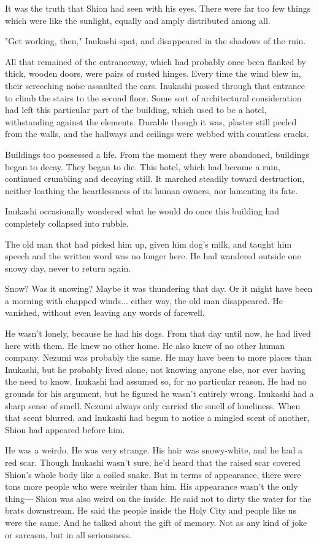 It was the truth that Shion had seen with his eyes. There were far too
few things which were like the sunlight, equally and amply distributed
among all.

"Get working, then," Inukashi spat, and disappeared in the shadows of
the ruin.

All that remained of the entranceway, which had probably once been
flanked by thick, wooden doors, were pairs of rusted hinges. Every time
the wind blew in, their screeching noise assaulted the ears. Inukashi
passed through that entrance to climb the stairs to the second floor.
Some sort of architectural consideration had left this particular part
of the building, which used to be a hotel, withstanding against the
elements. Durable though it was, plaster still peeled from the walls,
and the hallways and ceilings were webbed with countless cracks.

Buildings too possessed a life. From the moment they were abandoned,
buildings began to decay. They began to die. This hotel, which had
become a ruin, continued crumbling and decaying still. It marched
steadily toward destruction, neither loathing the heartlessness of its
human owners, nor lamenting its fate.

Inukashi occasionally wondered what he would do once this building had
completely collapsed into rubble.

The old man that had picked him up, given him dog's milk, and taught him
speech and the written word was no longer here. He had wandered outside
one snowy day, never to return again.

Snow? Was it snowing? Maybe it was thundering that day. Or it might have
been a morning with chapped winds... either way, the old man
disappeared. He vanished, without even leaving any words of farewell.

He wasn't lonely, because he had his dogs. From that day until now, he
had lived here with them. He knew no other home. He also knew of no
other human company. Nezumi was probably the same. He may have been to
more places than Inukashi, but he probably lived alone, not knowing
anyone else, nor ever having the need to know. Inukashi had assumed so,
for no particular reason. He had no grounds for his argument, but he
figured he wasn't entirely wrong. Inukashi had a sharp sense of smell.
Nezumi always only carried the smell of loneliness. When that scent
blurred, and Inukashi had begun to notice a mingled scent of another,
Shion had appeared before him.

He was a weirdo. He was very strange. His hair was snowy-white, and he
had a red scar. Though Inukashi wasn't sure, he'd heard that the raised
scar covered Shion's whole body like a coiled snake. But in terms of
appearance, there were tons more people who were weirder than him. His
appearance wasn't the only thing― Shion was also weird on the inside. He
said not to dirty the water for the brats downstream. He said the people
inside the Holy City and people like us were the same. And he talked
about the gift of memory. Not as any kind of joke or sarcasm, but in all
seriousness.

